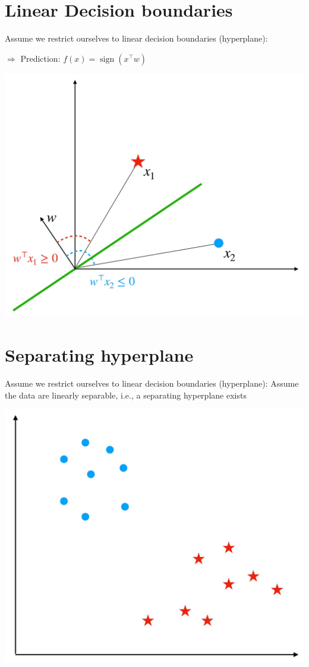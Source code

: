 \documentclass[10pt]{article}
\begin{document}
\section*{Linear Decision boundaries}
Assume we restrict ourselves to linear decision boundaries (hyperplane):

$\Rightarrow$ Prediction: $f(x)=\operatorname{sign}\left(x^{\top} w\right)$

\begin{center}
\includegraphics[max width=\textwidth]{2023_12_30_cf784c471dfd1dd5afbag-20}
\end{center}

\section*{Separating hyperplane}
Assume we restrict ourselves to linear decision boundaries (hyperplane): Assume the data are linearly separable, i.e., a separating hyperplane exists

\begin{center}
\includegraphics[max width=\textwidth]{2023_12_30_cf784c471dfd1dd5afbag-21}
\end{center}
\end{document}

